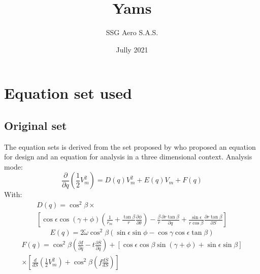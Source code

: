 \documentclass{report}
\begin{document}
    \title{Yams}
    \author{SSG Aero S.A.S.}
    \date{Jully 2021}
    \maketitle
    \chapter{Equation set used}
    \section{Original set}

        The equation sets is derived from the set proposed by \cite{Novak77} who proposed an equation for design and an equation for analysis in a three dimensional context.
        Analysis mode:
        \begin{equation}
            \frac{\partial}{\partial q} \left(\frac{1}{2}V_m^2\right) = 
            D\left(q\right) V_m^2 + E\left(q\right) V_m + F\left(q\right)
            \label{eq:analysis_general}
        \end{equation}
        With:
        \begin{equation}
            \begin{multlined}
                D\left(q\right) = \cos ^2 \beta \times \\ \left[
                    \cos \epsilon \cos\left(\gamma+\phi\right)\left(\frac{1}{r_m}+\frac{\tan \beta}{r}\frac{\partial \phi}{\partial \theta}\right)
                    -\frac{\beta}{r}\frac{\partial r \tan \beta}{\partial q}
                    +\frac{\sin \epsilon}{r \cos \beta} \frac{\partial r \tan \beta}{\partial S}
                    \right]
            \end{multlined}
        \end{equation}
        \begin{equation}
            E \left(q\right) = 2 \widetilde{\omega} \cos^2 \beta \left(\sin \epsilon \sin \phi - \cos \gamma \cos \epsilon \tan \beta\right)
        \end{equation}
        \begin{equation}
            \begin{multlined}
                F \left(q\right) = \cos ^2 \beta \left(\frac{\partial I}{\partial q} - t \frac{\partial \overline{S} }{\partial q} \right)
                + \left[
                    \cos \epsilon \cos \beta \sin \left( \gamma + \phi \right) + \sin \epsilon \sin \beta 
                    \right] 
                \\ \times \left[
                    \frac{d}{dS} \left(\frac{1}{2}V_m^2\right)  + \cos^2 \beta \left(f \frac{d\overline{S}}{dS}\right)
                \right]
            \end{multlined}
        \end{equation}
\end{document}
